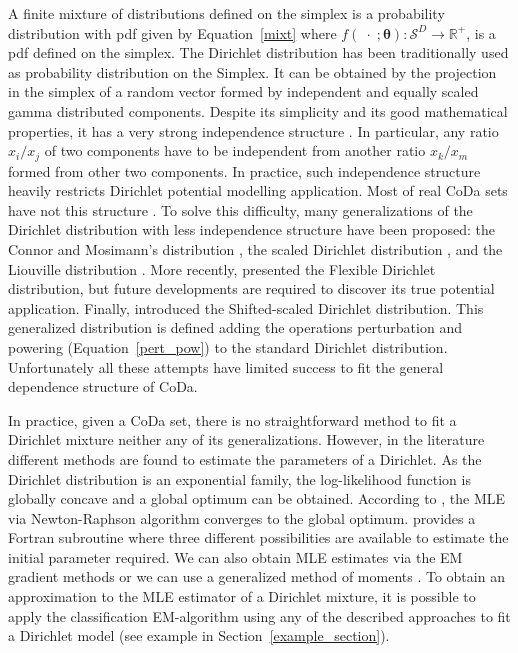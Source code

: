 \documentclass[12pt, a4paper]{article}
\newcommand{\m}[1]{\boldsymbol{#1}}
\begin{document}
\noindent A finite mixture of distributions defined on the simplex is a probability distribution with pdf given by Equation~\ref{mixt} where $f(\;\cdot\;;\m\theta): \mathcal{S}^D \rightarrow \mathbb{R}^+$, is a pdf defined on the simplex. The Dirichlet distribution has been traditionally used as probability distribution on the Simplex. It can be obtained by the projection in the simplex of a random vector formed by independent and equally scaled gamma distributed components. 
Despite its simplicity and its good mathematical properties, it has a very strong independence structure \citep{aitchison1986statistical}. In particular, any ratio $x_i/x_j$ of two components have to be independent from another
ratio $x_k/x_m$ formed from other two components. In practice, such independence structure heavily restricts Dirichlet potential modelling application. Most of real CoDa sets have not this structure \citep{aitchison1986statistical}. To solve this difficulty, many generalizations of the Dirichlet distribution with less independence structure have been proposed: the Connor and Mosimann's distribution
\citep{connor1969concepts}, the scaled Dirichlet distribution \citep{aitchison1986statistical},  and the Liouville distribution \citep{rayens1994dependence}.  More recently, \cite{ongaro2008new} presented the Flexible Dirichlet distribution, but future
developments are required to discover its true potential application. Finally, \cite{monti2011shifted} introduced the Shifted-scaled Dirichlet distribution. This generalized distribution is defined adding the operations
perturbation and powering (Equation~\ref{pert_pow}) to the standard Dirichlet distribution. Unfortunately all these attempts
have limited success to fit the general dependence structure of CoDa.


In practice, given a CoDa set, there is no straightforward method to fit a Dirichlet mixture neither any of its generalizations. However, in the literature different methods are found to estimate the parameters of a Dirichlet. As the Dirichlet distribution is an exponential family, the log-likelihood function is globally concave and a global optimum can be obtained. According to \cite{ng2011dirichlet}, the MLE via Newton-Raphson algorithm converges to the global optimum. \cite{narayanan1991algorithm} provides a Fortran subroutine where three different possibilities are available to estimate the initial parameter required.
We can also obtain MLE estimates via the EM gradient methods \citep{ng2011dirichlet} or we can use a generalized method of moments
\citep{hansen1982large}.  
To obtain an approximation to the MLE estimator of a Dirichlet mixture, it is possible to apply the classification EM-algorithm \citep{celeux1992classification} using any of the described approaches to fit a Dirichlet model (see example in Section~\ref{example_section}).
\end{document}
